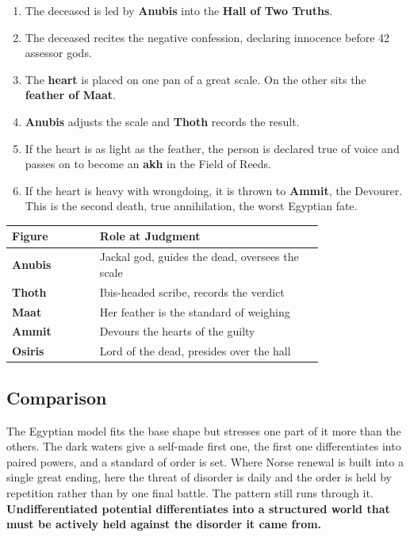 \begin{enumerate}
 \item The deceased is led by \textbf{Anubis} into the \textbf{Hall of Two Truths}.
 \item The deceased recites the negative confession, declaring innocence before 42 assessor gods.
 \item The \textbf{heart} is placed on one pan of a great scale. On the other sits the \textbf{feather of Maat}.
 \item \textbf{Anubis} adjusts the scale and \textbf{Thoth} records the result.
 \item If the heart is as light as the feather, the person is declared true of voice and passes on to become an \textbf{akh} in the Field of Reeds.
 \item If the heart is heavy with wrongdoing, it is thrown to \textbf{Ammit}, the Devourer. This is the second death, true annihilation, the worst Egyptian fate.
\end{enumerate}

\begin{longtable}{L{0.22\linewidth}
L{0.56\linewidth}}
\toprule
\textbf{Figure} & \textbf{Role at Judgment} \\
\midrule
\textbf{Anubis} & Jackal god, guides the dead, oversees the scale \\
\textbf{Thoth} & Ibis-headed scribe, records the verdict \\
\textbf{Maat} & Her feather is the standard of weighing \\
\textbf{Ammit} & Devours the hearts of the guilty \\
\textbf{Osiris} & Lord of the dead, presides over the hall \\
\bottomrule
\end{longtable}

\subsection{Comparison}

The Egyptian model fits the base shape but stresses one part of it more than the others. The dark waters give a self-made first one, the first one differentiates into paired powers, and a standard of order is set. Where Norse renewal is built into a single great ending, here the threat of disorder is daily and the order is held by repetition rather than by one final battle. The pattern still runs through it. \textbf{Undifferentiated potential differentiates into a structured world that must be actively held against the disorder it came from.}
